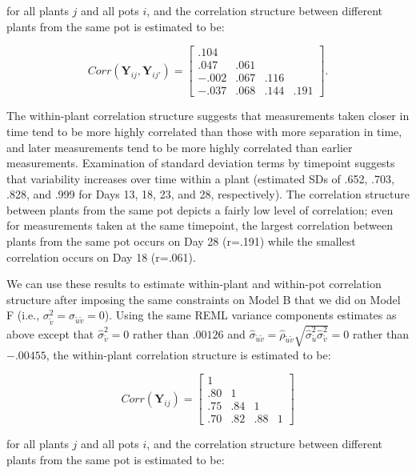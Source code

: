 \documentclass[
]{krantz}
\begin{document}
for all plants \(j\) and all pots \(i\), and the correlation structure between different plants from the same pot is estimated to be:

\[  Corr(\textbf{Y}_{ij},\textbf{Y}_{ij'}) = \left[
          \begin{array}{cccc}
            .104 & & & \\
            .047 & .061 & & \\
            -.002 & .067 & .116 & \\
            -.037 & .068 & .144 & .191
          \end{array} \right]. \]

The within-plant correlation structure suggests that measurements taken closer in time tend to be more highly correlated than those with more separation in time, and later measurements tend to be more highly correlated than earlier measurements. Examination of standard deviation terms by timepoint suggests that variability increases over time within a plant (estimated SDs of .652, .703, .828, and .999 for Days 13, 18, 23, and 28, respectively). The correlation structure between plants from the same pot depicts a fairly low level of correlation; even for measurements taken at the same timepoint, the largest correlation between plants from the same pot occurs on Day 28 (r=.191) while the smallest correlation occurs on Day 18 (r=.061).

We can use these results to estimate within-plant and within-pot correlation structure after imposing the same constraints on Model B that we did on Model F (i.e., \(\sigma_{\tilde{v}}^{2}=\sigma_{\tilde{u}\tilde{v}}=0\)). Using the same REML variance components estimates as above except that \(\hat{\sigma}_{\tilde{v}}^{2}=0\) rather than \(.00126\) and \(\hat{\sigma}_{\tilde{u}\tilde{v}}=\hat{\rho}_{\tilde{u}\tilde{v}}\sqrt{\hat{\sigma}_{\tilde{u}}^{2}\hat{\sigma}_{\tilde{v}}^{2}}=0\) rather than \(-.00455\), the within-plant correlation structure is estimated to be:

\[  Corr(\textbf{Y}_{ij}) = \left[
          \begin{array}{cccc}
            1 & & & \\
            .80 & 1 & & \\
            .75 & .84 & 1 & \\
            .70 & .82 & .88 & 1
          \end{array} \right] \]

for all plants \(j\) and all pots \(i\), and the correlation structure between different plants from the same pot is estimated to be:
\end{document}
